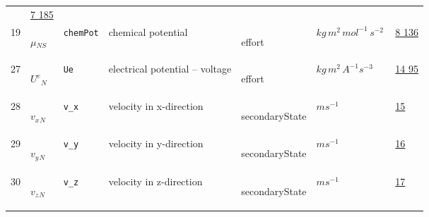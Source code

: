 \begin{longtable}{|p{1cm}|p{2.5cm}|p{4.5cm}|p{8cm}|p{3.0cm}|p{3cm}|p{1cm}|}
             &                 \hyperlink{"e:7"}{ 7 }
                                 \hyperlink{"e:185"}{ 185 }
                 \\
            19
             & \hypertarget{"v:19"}{ $ {\mu}{_{{N S}}} $}
             & \verb|chemPot|
             & chemical potential
             & \begin{lay}effort \end{lay}
             & $ kg \,m^{2} \,mol^{-1} \,s^{-2} \, $
             &                 \hyperlink{"e:8"}{ 8 }
                                 \hyperlink{"e:136"}{ 136 }
                 \\
            27
             & \hypertarget{"v:27"}{ $ {{U^e}}{_{N}} $}
             & \verb|Ue|
             & electrical potential -- voltage
             & \begin{lay}effort \end{lay}
             & $ kg \,m^{2} \,A^{-1} s^{-3} \, $
             &                 \hyperlink{"e:14"}{ 14 }
                                 \hyperlink{"e:95"}{ 95 }
                 \\
            28
             & \hypertarget{"v:28"}{ $ {{v_x}}{_{N}} $}
             & \verb|v_x|
             & velocity in x-direction
             & \begin{lay}secondaryState \end{lay}
             & $ m s^{-1} \, $
             &                 \hyperlink{"e:15"}{ 15 }
                 \\
            29
             & \hypertarget{"v:29"}{ $ {{v_y}}{_{N}} $}
             & \verb|v_y|
             & velocity in y-direction
             & \begin{lay}secondaryState \end{lay}
             & $ m s^{-1} \, $
             &                 \hyperlink{"e:16"}{ 16 }
                 \\
            30
             & \hypertarget{"v:30"}{ $ {{v_z}}{_{N}} $}
             & \verb|v_z|
             & velocity in z-direction
             & \begin{lay}secondaryState \end{lay}
             & $ m s^{-1} \, $
             &                 \hyperlink{"e:17"}{ 17 }
                 \\
    \end{longtable}